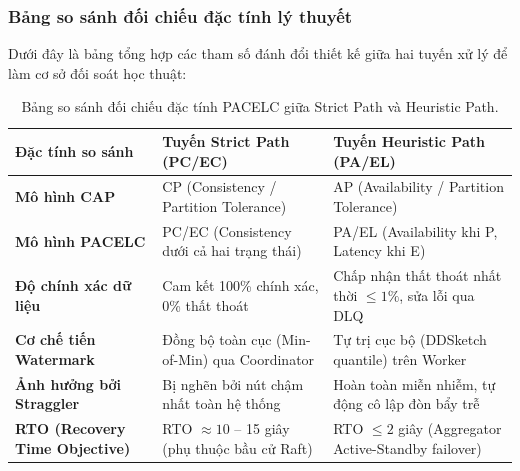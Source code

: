\documentclass[12pt,a4paper]{article}
\begin{document}
\subsubsection{Bảng so sánh đối chiếu đặc tính lý thuyết}
Dưới đây là bảng tổng hợp các tham số đánh đổi thiết kế giữa hai tuyến xử lý để làm cơ sở đối soát học thuật:

\begin{table}[H]
\centering
\small
\begin{tabular}{l p{} p{}}
\toprule
\textbf{Đặc tính so sánh} & \textbf{Tuyến Strict Path (PC/EC)} & \textbf{Tuyến Heuristic Path (PA/EL)} \\
\midrule
\textbf{Mô hình CAP} & CP (Consistency / Partition Tolerance) & AP (Availability / Partition Tolerance) \\
\textbf{Mô hình PACELC} & PC/EC (Consistency dưới cả hai trạng thái) & PA/EL (Availability khi P, Latency khi E) \\
\textbf{Độ chính xác dữ liệu} & Cam kết 100\% chính xác, 0\% thất thoát & Chấp nhận thất thoát nhất thời $\le 1\%$, sửa lỗi qua DLQ \\
\textbf{Cơ chế tiến Watermark} & Đồng bộ toàn cục (Min-of-Min) qua Coordinator & Tự trị cục bộ (DDSketch quantile) trên Worker \\
\textbf{Ảnh hưởng bởi Straggler} & Bị nghẽn bởi nút chậm nhất toàn hệ thống & Hoàn toàn miễn nhiễm, tự động cô lập đòn bẩy trễ \\
\textbf{RTO (Recovery Time Objective)} & RTO $\approx 10$ -- 15 giây (phụ thuộc bầu cử Raft) & RTO $\le 2$ giây (Aggregator Active-Standby failover) \\
\bottomrule
\end{tabular}
\caption{Bảng so sánh đối chiếu đặc tính PACELC giữa Strict Path và Heuristic Path.}
\label{tab:pacelc_comparison}
\end{table}
\end{document}
